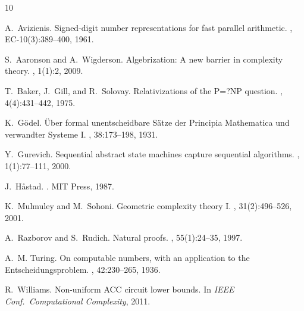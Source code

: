 \documentclass[11pt,a4paper]{article}
\theoremstyle{definition}
\theoremstyle{remark}
\begin{document}

\begin{thebibliography}{10}

A.~Avizienis.
\newblock Signed-digit number representations for fast parallel arithmetic.
, EC-10(3):389--400, 1961.

S.~Aaronson and A.~Wigderson.
\newblock Algebrization: A new barrier in complexity theory.
, 1(1):2, 2009.

T.~Baker, J.~Gill, and R.~Solovay.
\newblock Relativizations of the {P=?NP} question.
, 4(4):431--442, 1975.

K.~G\"odel.
\newblock \"Uber formal unentscheidbare {S\"atze} der {Principia Mathematica}
  und verwandter {Systeme I}.
, 38:173--198, 1931.

Y.~Gurevich.
\newblock Sequential abstract state machines capture sequential algorithms.
, 1(1):77--111, 2000.

J.~H{\aa}stad.
.
\newblock MIT Press, 1987.

K.~Mulmuley and M.~Sohoni.
\newblock Geometric complexity theory {I}.
, 31(2):496--526, 2001.

A.~Razborov and S.~Rudich.
\newblock Natural proofs.
, 55(1):24--35, 1997.

A.~M. Turing.
\newblock On computable numbers, with an application to the
  {Entscheidungsproblem}.
, 42:230--265, 1936.

R.~Williams.
\newblock Non-uniform {ACC} circuit lower bounds.
\newblock In {\em IEEE Conf.\ Computational Complexity}, 2011.

\end{thebibliography}
\end{document}
